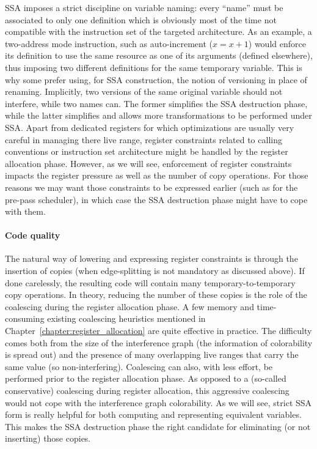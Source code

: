SSA imposes a strict discipline on variable naming: 
every ``name'' must be associated to only one definition which is obviously most of the time not compatible with the instruction set of the targeted architecture. 
As an example, a two-address mode instruction, such as auto-increment ($x=x+1$) would enforce its definition to use the same resource as one of its arguments (defined elsewhere), thus imposing two different definitions for the same temporary variable. 
This is why some prefer using, for SSA construction, the notion of versioning in place of renaming. 
Implicitly, two versions of the same original variable should not interfere, while two names can. 
The former simplifies the SSA destruction phase, while the latter simplifies and allows more transformations to be performed under SSA. 
Apart from dedicated registers for which optimizations are usually very careful in managing there live range, register constraints related to calling conventions or instruction set architecture might be handled by the register allocation phase. 
However, as we will see, enforcement of register constraints impacts the register pressure as well as the number of copy operations. 
For those reasons we may want those constraints to be expressed earlier (such as for the pre-pass scheduler), in which case the SSA destruction phase might have to cope with them.

\paragraph{Code quality}
The natural way of lowering \phifuns and expressing register constraints is through the insertion of copies (when edge-splitting is not mandatory as discussed above). 
If done carelessly, the resulting code will contain many temporary-to-temporary copy operations. 
In theory, reducing the number of these copies is the role of the coalescing during the register allocation phase. 
A few memory and time-consuming existing coalescing heuristics mentioned in Chapter~\ref{chapter:register_allocation} are quite effective in practice. 
The difficulty comes both from the size of the interference graph (the information of colorability is spread out) and the presence of many overlapping live ranges that carry the same value (so non-interfering). 
Coalescing can also, with less effort, be performed prior to the register allocation phase. 
As opposed to a (so-called conservative) coalescing during register allocation, this aggressive coalescing would not cope with the interference graph colorability. 
As we will see, strict SSA form is really helpful for both computing and representing equivalent variables. 
This makes the SSA destruction phase the right candidate for eliminating (or not inserting) those copies.


